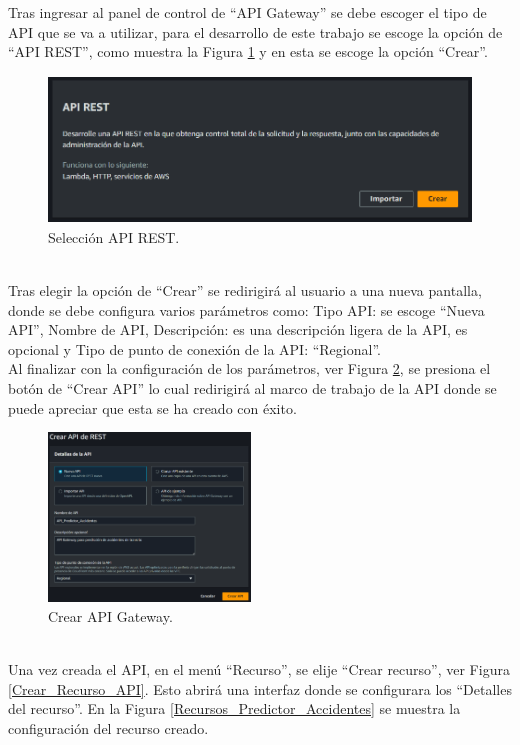 \documentclass[a4paper,10pt, oneside, titlepage]{article}
\begin{document}
	\indent Tras ingresar al panel de control de ``API Gateway'' se debe escoger el tipo de API que se va a utilizar, para el desarrollo de este trabajo se escoge la opción de ``API REST'', como muestra la Figura \ref{Seleccion_API_REST} y en esta se escoge la opción ``Crear''. 
	\begin{figure}[!h]
		\centering
		\includegraphics[width = 1\linewidth, height = 3.9cm]{Seleccion_API_REST.png}
		\caption{Selección API REST.}
		\label{Seleccion_API_REST}
	\end{figure} \\
	\indent Tras elegir la opción de ``Crear'' se redirigirá al usuario a una nueva pantalla, donde se debe configura varios parámetros como: Tipo API: se escoge ``Nueva API'', Nombre de API, Descripción: es una descripción ligera de la API, es opcional y Tipo de punto de conexión de la API: ``Regional''. \\\newline
	\indent Al finalizar con la configuración de los parámetros, ver Figura \ref{Crear_API_Gateway}, se presiona el botón de ``Crear API'' lo cual redirigirá al marco de trabajo de la API donde se puede apreciar que esta se ha creado con éxito.
	\begin{figure}[!h]
		\centering
		\includegraphics[width = 1\linewidth, height = 4.5cm]{Crear_API_Gateway.png}
		\caption{Crear API Gateway.}
		\label{Crear_API_Gateway}
	\end{figure} \\
	\indent Una vez creada el API, en el menú ``Recurso'', se elije ``Crear recurso'', ver Figura \ref{Crear_Recurso_API}. Esto abrirá una interfaz donde se configurara los ``Detalles del recurso''. En la Figura \ref{Recursos_Predictor_Accidentes} se muestra la configuración del recurso creado.
\end{document}
